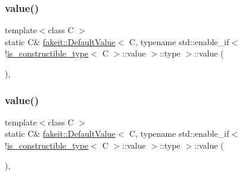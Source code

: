 \subsubsection{\texorpdfstring{value()}{value()}\hspace{0.1cm}{\footnotesize\ttfamily [2/9]}}
{\footnotesize\ttfamily template$<$class C $>$ \\
static C\& \mbox{\hyperlink{structfakeit_1_1DefaultValue}{fakeit\+::\+Default\+Value}}$<$ C, typename std\+::enable\+\_\+if$<$!\mbox{\hyperlink{structfakeit_1_1is__constructible__type}{is\+\_\+constructible\+\_\+type}}$<$ C $>$\+::value $>$\+::type $>$\+::value (\begin{DoxyParamCaption}{ }\end{DoxyParamCaption})\hspace{0.3cm}{\ttfamily [inline]}, {\ttfamily [static]}}

\mbox{\label{structfakeit_1_1DefaultValue_3_01C_00_01typename_01std_1_1enable__if_3_9is__constructible__type_237d75e2cfb810085e1504a1340d5949_ace6890104d79eccdf278ceb3b8d1d887}} 
\subsubsection{\texorpdfstring{value()}{value()}\hspace{0.1cm}{\footnotesize\ttfamily [3/9]}}
{\footnotesize\ttfamily template$<$class C $>$ \\
static C\& \mbox{\hyperlink{structfakeit_1_1DefaultValue}{fakeit\+::\+Default\+Value}}$<$ C, typename std\+::enable\+\_\+if$<$!\mbox{\hyperlink{structfakeit_1_1is__constructible__type}{is\+\_\+constructible\+\_\+type}}$<$ C $>$\+::value $>$\+::type $>$\+::value (\begin{DoxyParamCaption}{ }\end{DoxyParamCaption})\hspace{0.3cm}{\ttfamily [inline]}, {\ttfamily [static]}}

